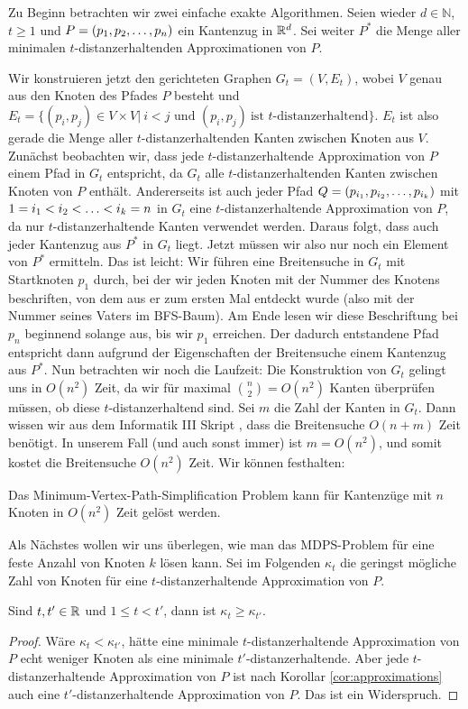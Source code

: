 	Zu Beginn betrachten wir zwei einfache exakte Algorithmen.
    Seien wieder $d \in \mathbb{N}$, $t \geq 1$ und $P = (p_1, p_2, \mathellipsis, p_n)$ ein Kantenzug in $\mathbb{R}^d$. Sei weiter $P^*$ die Menge aller minimalen $t$-distanzerhaltenden Approximationen von $P$.
    
    Wir konstruieren jetzt den gerichteten Graphen $G_t = (V,E_t)$, wobei $V$ genau aus den Knoten des Pfades $P$ besteht und 
    $E_t = \{(p_i, p_j) \in V\times V|\ i < j \text{ und } (p_i,p_j)\ \text{ist $t$-distanzerhaltend}\}$. 
    $E_t$ ist also gerade die Menge aller $t$-distanzerhaltenden Kanten zwischen Knoten aus $V$. Zunächst beobachten wir, dass jede $t$-distanzerhaltende Approximation von $P$ einem Pfad in $G_t$ entspricht, da $G_t$ alle $t$-distanzerhaltenden Kanten zwischen Knoten von $P$ enthält. 
    Andererseits ist auch jeder Pfad $Q = (p_{i_1}, p_{i_2}, \mathellipsis, p_{i_k})$ mit $1 = i_1 < i_2 < \mathellipsis < i_k = n$ in $G_t$ eine $t$-distanzerhaltende Approximation von $P$, da nur $t$-distanzerhaltende Kanten verwendet werden. 
    Daraus folgt, dass auch jeder Kantenzug aus $P^*$ in $G_t$ liegt. Jetzt müssen wir also nur noch ein Element von $P^*$ ermitteln. 
    Das ist leicht: Wir führen eine Breitensuche in $G_t$ mit Startknoten $p_1$ durch, bei der wir jeden Knoten mit der Nummer des Knotens beschriften, von dem aus er zum ersten Mal entdeckt wurde (also mit der Nummer seines Vaters im BFS-Baum). 
    Am Ende lesen wir diese Beschriftung bei $p_n$ beginnend solange aus, bis wir $p_1$ erreichen. Der dadurch entstandene Pfad entspricht dann aufgrund der Eigenschaften der Breitensuche einem Kantenzug aus $P^*$. 
    Nun betrachten wir noch die Laufzeit: Die Konstruktion von $G_t$ gelingt uns in $O(n^2)$ Zeit, da wir für maximal $\binom{n}{2} = O(n^2)$ Kanten überprüfen müssen, ob diese $t$-distanzerhaltend sind. Sei $m$ die Zahl der Kanten in $G_t$. Dann wissen wir aus dem Informatik III Skript \cite{hagerup}, dass die Breitensuche $O(n+m)$ Zeit benötigt. In unserem Fall (und auch sonst immer) ist $m = O(n^2)$, und somit kostet die Breitensuche $O(n^2)$ Zeit. Wir können festhalten:
    \begin{theorem}
    	\label{theo:mvpsex}
    	Das Minimum-Vertex-Path-Simplification Problem kann für Kantenzüge mit $n$ Knoten in $O(n^2)$ Zeit gelöst werden.
    \end{theorem} 
    
    Als Nächstes wollen wir uns überlegen, wie man das MDPS-Problem für eine feste Anzahl von Knoten $k$ lösen kann. Sei im Folgenden $\kappa_t$ die geringst mögliche Zahl von Knoten für eine $t$-distanzerhaltende Approximation von $P$.
	\begin{lemma}
		\label{lem:kappa}
		Sind $t, t' \in \mathbb{R}$ und $1 \leq t < t'$, dann ist $\kappa_t \geq \kappa_{t'}$.
	\end{lemma}
	\begin{proof}
		Wäre $\kappa_{t} < \kappa_{t'}$, hätte eine minimale $t$-distanzerhaltende Approximation von $P$ echt weniger Knoten als eine minimale $t'$-distanzerhaltende. Aber jede $t$-distanzerhaltende Approximation von $P$ ist nach Korollar \ref{cor:approximations} auch eine $t'$-distanzerhaltende Approximation von $P$. Das ist ein Widerspruch. 
	\end{proof}
	
